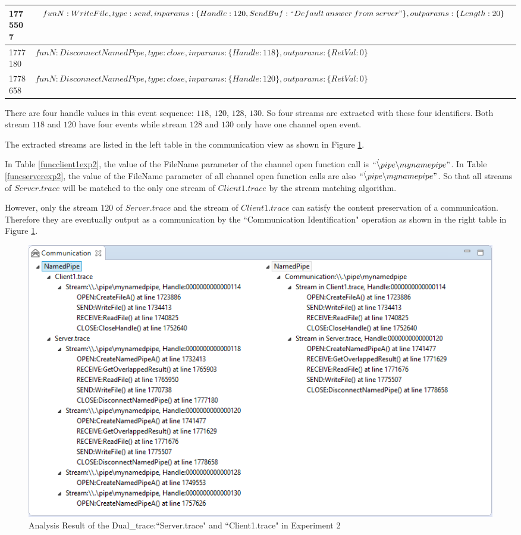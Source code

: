 \begin{table}[H]
\begin{tabular}{|l|p{16cm}|}
\hline
  1775507 & $funN:WriteFile, type:send, inparams:\lbrace Handle:120, SendBuf:``Default\: answer\: from\: server"\rbrace, outparams: \lbrace Length:20 \rbrace$\\
\hline
 1777180&$funN:DisconnectNamedPipe, type:close, inparams: \lbrace Handle:118 \rbrace, outparams: \lbrace RetVal:0 \rbrace$\\
\hline   
 1778658&$funN:DisconnectNamedPipe, type:close, inparams: \lbrace Handle:120 \rbrace, outparams: \lbrace RetVal:0 \rbrace$\\
\hline               
  \end{tabular}
\end{table}

There are four handle values in this event sequence: $118$, $120$, $128$, $130$. So four streams are extracted with these four identifiers. Both stream $118$ and $120$ have four events while stream $128$ and $130$ only have one channel open event. 

The extracted streams are listed in the left table in the communication view as shown in Figure \ref{result21}.

In Table \ref{funcclient1exp2}, the value of the FileName parameter of the channel open function call is $``\dot \backslash pipe \backslash mynamepipe"$. In Table \ref{funcserverexp2}, the value of the FileName parameter of all channel open function calls are also $``\dot \backslash pipe \backslash mynamepipe"$. So that all streams of $Server.trace$ will be matched to the only one stream of $Client1.trace$ by the stream matching algorithm.

However, only the stream $120$ of $Server.trace$ and the stream of $Client1.trace$ can satisfy the content preservation of a communication. Therefore they are eventually output as a communication by the ``Communication Identification" operation as shown in the right table in Figure \ref{result21}. 

\begin{figure}[H]
\centerline{\includegraphics[scale=0.55]{Figures/result21}}
 \caption{Analysis Result of the Dual\_trace:``Server.trace" and ``Client1.trace" in Experiment 2}
\label{result21}
\end{figure}


